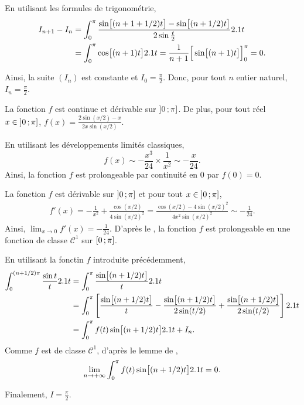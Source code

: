 \begin{solution}
\begin{reponses}
\item En utilisant les formules de trigonométrie,
\begin{align*}
I_{n+1} - I_n
&= \int_0^\pi \frac{\sin\mathopen{}\big[(n + 1 + 1/2)t\big] - \sin\mathopen{}\big[(n + 1/2) t\big]}{2 \sin \frac{t}{2}} 2.1 t\\
&= \int_0^\pi \cos\mathopen{}\big[(n + 1) t\big] 2.1 t
= \frac{1}{n + 1} \Big[\sin\mathopen{}\big[(n + 1) t\big]\Big]_{0}^\pi
= 0.
\end{align*}

Ainsi, la suite $(I_n)$ est constante et $I_0 = \frac{\pi}{2}$. Donc, pour tout $n$ entier naturel, $I_n = \frac{\pi}{2}$.

\item La fonction $f$ est continue et dérivable sur $\left]0\,;\pi\right]$. De plus, pour tout réel $x \in \left]0\,;\pi\right]$, $f(x) = \frac{2 \sin(x/2) - x}{2 x \sin(x/2)}$.

En utilisant les développements limités classiques,
\[
f(x)
\sim -\frac{x^3}{24} \times \frac{1}{x^2}
\sim -\frac{x}{24}.
\]
Ainsi, la fonction $f$ est prolongeable par continuité en $0$ par $f(0) = 0$.

\medskip

La fonction $f$ est dérivable sur $\left]0\,;\pi\right]$ et pour tout $x \in \left]0\,;\pi\right]$,
\begin{align*}
f'(x) = -\frac{1}{x^2} + \frac{\cos(x/2)}{4 \sin(x/2)^2} = \frac{\cos(x/2) - 4 \sin(x/2)^2}{4 x^2 \sin(x/2)^2} \sim -\frac{1}{24}.
\end{align*}
Ainsi, $\lim_{x\to0} f'(x) = -\frac{1}{24}$. D'après le , la fonction $f$ est prolongeable en une fonction de classe $\mathscr{C}^1$ sur $\left[0\,;\pi\right]$.

\item En utilisant la fonctin $f$ introduite précédemment,
\begin{align*}
\int_0^{(n + 1/2) \pi} \frac{\sin t}{t} 2.1 t
&= \int_0^\pi \frac{\sin\mathopen{}\big[(n + 1/2) t\big]}{t} 2.1 t\\
&= \int_0^\pi \left[ \frac{\sin\mathopen{}\big[(n + 1/2) t\big]}{t} - \frac{\sin\mathopen{}\big[(n + 1/2) t\big]}{2 \sin (t/2)} + \frac{\sin\mathopen{}\big[(n + 1/2) t\big]}{2 \sin(t/2)} \right] 2.1 t\\
&= \int_0^\pi f(t) \sin\mathopen{}\big[(n + 1/2) t\big] 2.1 t + I_n.
\end{align*}
Comme $f$ est de classe $\mathscr{C}^1$, d'après le lemme de ,
\[
\lim_{n\to+\infty} \int_0^\pi f(t) \sin\mathopen{}\big[(n + 1/2) t\big] 2.1 t = 0.
\]

Finalement, $I = \frac{\pi}{2}$.
\end{reponses}
\end{solution}

